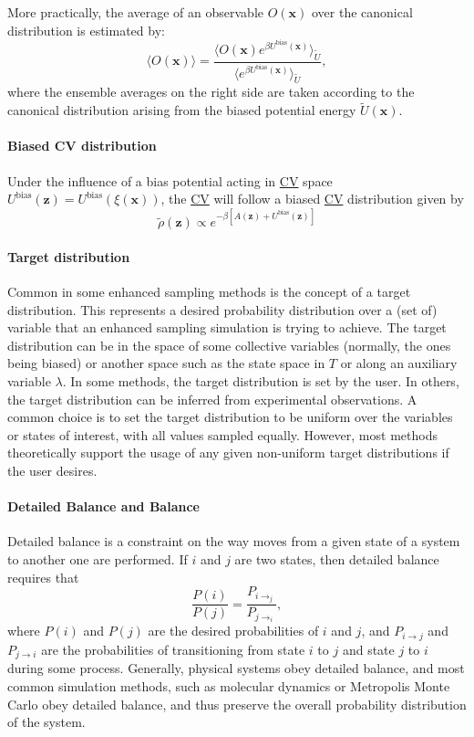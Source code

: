 \documentclass[9pt,review]{livecoms}
\newcommand{\vx}{\mathbf{x}}
\newcommand{\vz}{\mathbf{z}}
\begin{document}
More practically, the average of an observable $O(\vx)$ over the canonical distribution is estimated by:
\begin{equation}
\langle O(\vx) \rangle = \frac{\langle O(\vx) e^{\beta U^\mathrm{bias}(\vx)} \rangle_{\tilde U}}
{\langle e^{\beta U^\mathrm{bias}(\vx)} \rangle_{\tilde U}},
\end{equation}
where the ensemble averages on the right side are taken according to the canonical distribution arising from the biased potential energy $\tilde U(\vx)$.


\paragraph{Biased CV distribution}
Under the influence of a bias potential acting in \hyperlink{ref:CV} {CV} space $U^\mathrm{bias}(\vz)=U^\mathrm{bias}(\xi(\vx))$, the \hyperlink{ref:CV} {CV} will follow a biased \hyperlink{ref:CV} {CV} distribution given by
\begin{equation}
\tilde \rho(\vz) \propto e^{-\beta \left[
A(\vz) + U^\mathrm{bias}(\vz)
\right]}
\end{equation}

\hypertarget{ref:targetdist}{\paragraph{Target distribution}}
Common in some enhanced sampling methods is the concept of a target distribution. This represents a desired probability distribution over a (set of) variable that an enhanced sampling simulation is trying to achieve. The target distribution can be in the space of some collective variables (normally, the ones being biased) or another space such as the state space in $T$ or along an auxiliary variable $\lambda$. In some methods, the target distribution is set by the user. In others, the target distribution can be inferred from experimental observations. A common choice is to set the target distribution to be uniform over the variables or states of interest, with all values sampled equally. However, most methods theoretically support the usage of any given non-uniform target distributions if the user desires.

\hypertarget{ref:Balance} {\paragraph{Detailed Balance and Balance}}
Detailed balance is a constraint on the way moves from a given state of a system to another one are performed.  If $i$ and $j$ are two states, then detailed balance requires that
\begin{equation}
\frac{P(i)}{P(j)} = \frac{P_{i\rightarrow_j}}{P_{j\rightarrow_i}},
\end{equation}
where $P(i)$ and $P(j)$ are the desired probabilities of $i$ and $j$, and $P_{i\rightarrow j}$ and $P_{j\rightarrow i}$ are the probabilities of transitioning from state $i$ to $j$ and state $j$ to $i$ during some process.
Generally, physical systems obey detailed balance, and most common simulation methods, such as molecular dynamics or Metropolis Monte Carlo obey detailed balance, and thus preserve the overall probability distribution of the system.
\end{document}
